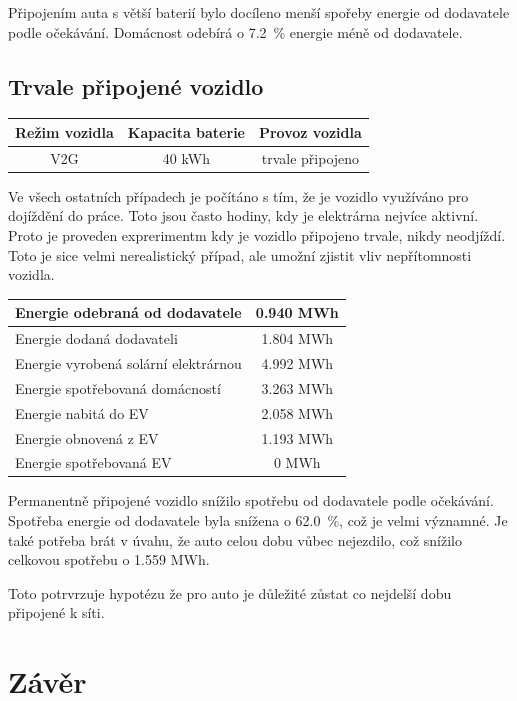 \documentclass[12pt,a4paper]{article}
\begin{document}
Připojením auta s větší baterií bylo docíleno menší spořeby energie od dodavatele podle očekávání.
Domácnost odebírá o 7.2~\% energie méně od dodavatele.

\subsection{Trvale připojené vozidlo}

\bigskip
\begin{tabular}{ | c | c | c | }
\hline
Režim vozidla & Kapacita baterie & Provoz vozidla \\
\hline
V2G & 40 kWh & trvale připojeno \\
\hline
\end{tabular}
\bigskip

Ve všech ostatních případech je počítáno s tím, že je vozidlo využíváno pro dojíždění do práce.
Toto jsou často hodiny, kdy je elektrárna nejvíce aktivní.
Proto je proveden exprerimentm kdy je vozidlo připojeno trvale, nikdy neodjíždí.
Toto je sice velmi nerealistický případ, ale umožní zjistit vliv nepřítomnosti vozidla.

\bigskip
\begin{tabular}{ | l | c | }
\hline
Energie odebraná od dodavatele & 0.940 MWh \\
\hline
Energie dodaná dodavateli & 1.804 MWh \\
\hline
Energie vyrobená solární elektrárnou & 4.992 MWh \\
\hline
Energie spotřebovaná domácností & 3.263 MWh \\
\hline
Energie nabitá do EV & 2.058 MWh \\
\hline
Energie obnovená z EV & 1.193 MWh \\
\hline
Energie spotřebovaná EV & 0 MWh \\
\hline
\end{tabular}
\bigskip

Permanentně připojené vozidlo snížilo spotřebu od dodavatele podle očekávání.
Spotřeba energie od dodavatele byla snížena o 62.0~\%, což je velmi významné.
Je také potřeba brát v úvahu, že auto celou dobu vůbec nejezdilo, což snížilo celkovou spotřebu o 1.559 MWh.

Toto potrvrzuje hypotézu že pro auto je důležité zůstat co nejdelší dobu připojené k síti.

\newpage

\section{Závěr}
\end{document}
